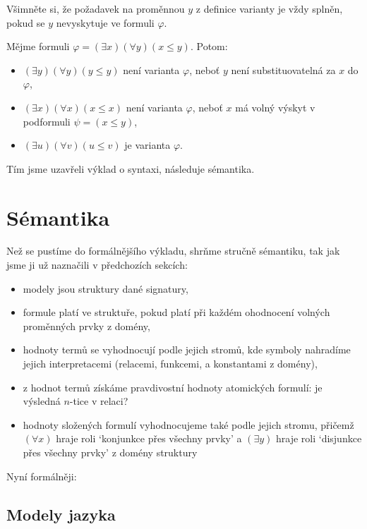 Všimněte si, že požadavek na proměnnou $y$ z definice varianty je vždy splněn, pokud se $y$ nevyskytuje ve formuli $\varphi$.

\begin{example}
    Mějme formuli $\varphi=(\exists x)(\forall y)(x\leq y)$. Potom:
\begin{itemize}
    \item $(\exists y)(\forall y)(y\leq y)$ není varianta $\varphi$, neboť $y$ není substituovatelná za $x$ do $\varphi$,
    \item $(\exists x)(\forall x)(x\leq x)$ není varianta $\varphi$, neboť $x$ má volný výskyt v podformuli $\psi=(x\leq y)$,
    \item $(\exists u)(\forall v)(u\leq v)$ je varianta $\varphi$.
\end{itemize}   
\end{example}

Tím jsme uzavřeli výklad o syntaxi, následuje sémantika.


\section{Sémantika}\label{section:predicate-semantics}

Než se pustíme do formálnějšího výkladu, shrňme stručně sémantiku, tak jak jsme ji už naznačili v předchozích sekcích: 

\begin{itemize}
    \item modely jsou struktury dané signatury,
    \item formule platí ve struktuře, pokud platí při každém ohodnocení volných proměnných prvky z domény,
    \item hodnoty termů se vyhodnocují podle jejich stromů, kde symboly nahradíme jejich interpretacemi (relacemi, funkcemi, a konstantami z domény),
    \item z hodnot termů získáme pravdivostní hodnoty atomických formulí: je výsledná $n$-tice v relaci?
    \item hodnoty složených formulí vyhodnocujeme také podle jejich stromu, přičemž $(\forall x)$ hraje roli `konjunkce přes všechny prvky' a  $(\exists y)$ hraje roli `disjunkce přes všechny prvky' z domény struktury
\end{itemize}

Nyní formálněji:

\subsection{Modely jazyka}

